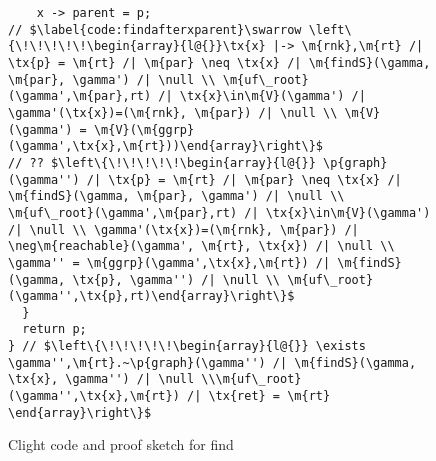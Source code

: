 \begin{figure}[t]
\begin{lstlisting}
    x -> parent = p;
// $\label{code:findafterxparent}\swarrow \left\{\!\!\!\!\!\begin{array}{l@{}}\tx{x} |-> \m{rnk},\m{rt} /| \tx{p} = \m{rt} /| \m{par} \neq \tx{x} /| \m{findS}(\gamma, \m{par}, \gamma') /| \null \\ \m{uf\_root}(\gamma',\m{par},rt) /| \tx{x}\in\m{V}(\gamma') /| \gamma'(\tx{x})=(\m{rnk}, \m{par}) /| \null \\ \m{V}(\gamma') = \m{V}(\m{ggrp}(\gamma',\tx{x},\m{rt}))\end{array}\right\}$
// ?? $\left\{\!\!\!\!\!\begin{array}{l@{}} \p{graph}(\gamma'') /| \tx{p} = \m{rt} /| \m{par} \neq \tx{x} /| \m{findS}(\gamma, \m{par}, \gamma') /| \null \\ \m{uf\_root}(\gamma',\m{par},rt) /| \tx{x}\in\m{V}(\gamma') /| \null \\ \gamma'(\tx{x})=(\m{rnk}, \m{par}) /| \neg\m{reachable}(\gamma', \m{rt}, \tx{x}) /| \null \\ \gamma'' = \m{ggrp}(\gamma',\tx{x},\m{rt}) /| \m{findS}(\gamma, \tx{p}, \gamma'') /| \null \\ \m{uf\_root}(\gamma'',\tx{p},rt)\end{array}\right\}$
  } 
  return p;
} // $\left\{\!\!\!\!\!\begin{array}{l@{}} \exists \gamma'',\m{rt}.~\p{graph}(\gamma'') /| \m{findS}(\gamma, \tx{x}, \gamma'') /| \null \\\m{uf\_root}(\gamma'',\tx{x},\m{rt}) /| \tx{ret} = \m{rt}  \end{array}\right\}$ 
\end{lstlisting}







\vspace{-0.4em}
\caption{Clight code and proof sketch for find}
\label{fig:find}
\vspace{-1em}
\end{figure}